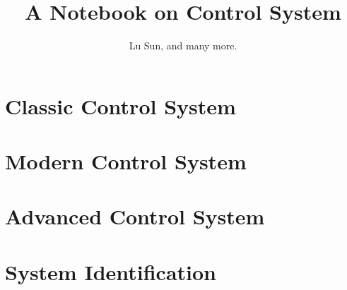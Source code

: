 



\makeindex



\frontmatter

\title{A Notebook on Control System}
\author{Lu Sun, and many more.}

\maketitle


\tableofcontents


\listoffigures
\listoftables

\mainmatter

\part{Classic Control System}





\part{Modern Control System}





\part{Advanced Control System}







\part{System Identification}





